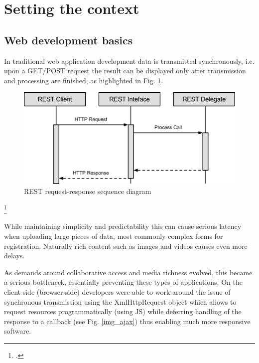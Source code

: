 \newpage
\section{Setting the context}
\label{setting_the_context}
\subsection{Web development basics}

In traditional web application development data is transmitted synchronously,
i.e. upon a GET/POST request the result can be displayed only after transmission
and processing are finished, as highlighted in Fig. \ref{img_req_res}.

\begin{figure}[hbtp]
\centering
\includegraphics[scale=0.75]{img/rest_call.png}
\caption[REST request-response sequence diagram]{REST request-response sequence diagram\label{img_req_res}}
\end{figure}
\footcitetext{req_res}

While maintaining simplicity and
predictability this can cause serious latency when uploading large pieces of
data, most commonly complex forms for registration. Naturally rich content such
as images and videos causes even more delays.

As demands around collaborative access and media richness evolved, this became a
serious bottleneck, essentially preventing these types of applications. On the
client-side (browser-side) developers were able to work around the issue of
synchronous transmission using the XmlHttpRequest object which allows to request
resources programmatically (using JS) while
deferring handling of the response to a callback (see Fig. \ref{img_ajax}) thus enabling much more responsive software.

